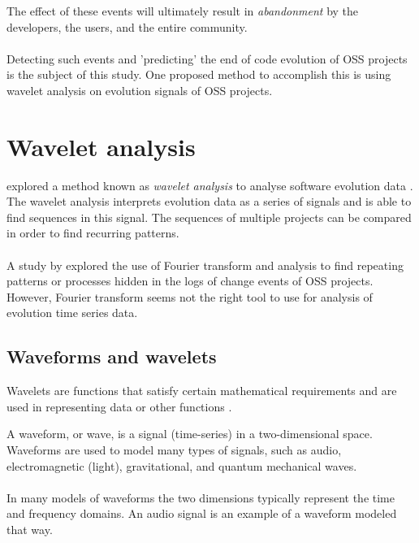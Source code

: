 The effect of these events will ultimately result in \textit{abandonment} by
the developers, the users, and the entire community.

\paragraph{}
Detecting such events and 'predicting' the end of code evolution of OSS projects
is the subject of this study. One proposed method to accomplish this is using
wavelet analysis on evolution signals of OSS projects.



\section{Wavelet analysis}
\label{wavelet_analysis}
\citeauthor{karus2013} explored a method known as \textit{wavelet analysis} to
analyse software evolution data \cite{karus2013, karus20132}. The wavelet
analysis interprets evolution data as a series of signals and is able to find
sequences in this signal. The sequences of multiple projects can be compared in
order to find recurring patterns.

\paragraph{}
A study by \citet{hindle} explored the use of Fourier transform and analysis to
find repeating patterns or processes hidden in the logs of change events of OSS
projects. However, Fourier transform seems not the right tool to use for
analysis of evolution time series data.

\subsection{Waveforms and wavelets}
Wavelets are functions that satisfy certain mathematical requirements and are
used in representing data or other functions \cite{graps}.

A waveform, or wave, is a signal (time-series) in a two-dimensional space.
Waveforms are used to model many types of signals, such as audio,
electromagnetic (light), gravitational, and quantum mechanical waves.

\paragraph{}
In many models of waveforms the two dimensions typically represent the time and
frequency domains. An audio signal is an example of a waveform modeled that way.

